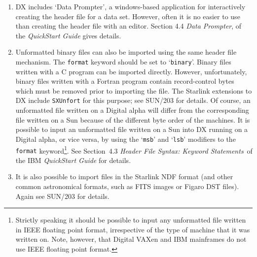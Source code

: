 \documentclass[twoside,11pt]{article}
\newcommand{\latex}[1]{#1}
\newcommand{\xref}[3]{#1}
\begin{document}
\begin{enumerate}

  \item DX includes `Data Prompter', a windows-based application for
   interactively creating the header file for a data set. However, often
   it is no easier to use than creating the header file with an editor.
   Section 4.4 {\it Data Prompter}, of the {\it QuickStart
   Guide}\cite{QUICKS} gives details.

  \latex{\newpage}
  \item Unformatted binary files can also be imported using the same
   header file mechanism. The {\tt format} keyword should be set to
   `{\tt binary}'. Binary files written with a C program can be
   imported directly. However, unfortunately, binary files  written with
   a Fortran program contain record-control bytes which must be
   removed prior to importing the file. The Starlink extensions to DX
   include {\tt SXUnfort} for this purpose; see
   \xref{SUN/203}{sun203}{}\cite{SUN203} for details. Of course, an
   unformatted file written on a Digital alpha will differ from the
   corresponding file written on a Sun because of the different byte
   order of the machines. It is possible to input an unformatted file
   written on a Sun into DX running on a Digital alpha, or vice versa, by
   using the `{\tt msb}' and `{\tt lsb}' modifiers to the {\tt format}
   keyword\footnote{Strictly speaking it should be possible to input any
   unformatted file written in IEEE floating point format, irrespective
   of the type of machine that it was written on. Note, however, that
   Digital VAXen and IBM mainframes do not use IEEE floating point format.}.
   See Section~4.3 {\it Header File Syntax: Keyword Statements}\, of the
   IBM {\it QuickStart Guide}\cite{QUICKS} for details.

  \item It is also possible to import files in the Starlink NDF format
   (and other common astronomical formats, such as FITS images or Figaro
   DST files). Again see \xref{SUN/203}{sun203}{}\cite{SUN203} for details.

\end{enumerate}
\end{document}
